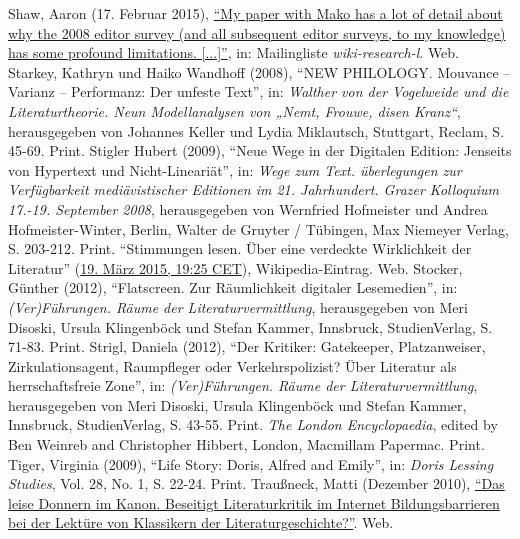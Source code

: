 \documentclass[fontsize=12pt]{scrartcl}
\begin{document}
{{{{\begin{thebibliography}
	Shaw, Aaron (17. Februar 2015), \href{https://lists.wikimedia.org/pipermail/wiki-research-l/2015-February/004172.html}{"`My paper with Mako has a lot of detail about why the 2008 editor survey (and all subsequent editor surveys, to my know\-ledge) has some profound limitations. [...]"'}, in: Mailing\-liste \textit{wiki-research-l}. Web.
	Starkey, Kathryn und Haiko Wandhoff (2008), "`NEW PHILOLOGY. Mouvance -- Va\-ri\-anz -- Performanz: Der unfeste Text"', in: \textit{Walther von der Vogelweide und die Li\-te\-ra\-tur\-theorie. Neun Modellana\-lysen von „Nemt, Frouwe, disen Kranz“}, he\-rausgegeben von Johannes Keller und Lydia Miklautsch, Stuttgart, Reclam, S. 45-69. Print.
	Stigler Hubert (2009), "`Neue Wege in der Digitalen Edition: Jenseits von Hypertext und Nicht-Lineari\"at"', in: \textit{Wege zum Text. \"uberlegungen zur Verf\"ugbarkeit medi\"avistischer Editionen im 21. Jahrhundert. Grazer Kolloquium 17.-19. September 2008}, he\-rausgegeben von Wernfried Hofmeister und Andrea Hofmeister-Winter, Ber\-lin, Walter de Gruyter / T\"ubingen, Max Niemeyer Verlag, S. 203-212. Print.
	"`Stimmungen lesen. \"Uber eine verdeckte Wirklichkeit der Li\-te\-ra\-tur"' (\href{https://de.wikipedia.org/w/index.php?title=Stimmungen_lesen._\%C3\%9Cber_eine_verdeckte_Wirklichkeit_der_Literatur\&oldid=139943406}{19. M\"arz 2015, 19:25 CET}), Wi\-ki\-pe\-dia-Ein\-trag. Web.
	Stocker, G\"unther (2012), "`Flatscreen. Zur R\"aumlichkeit digitaler Lesemedien"', in: \textit{(Ver)\-F\"uh\-rungen. R\"aume der Li\-te\-ra\-tur\-ver\-mitt\-lung}, he\-rausgegeben von Meri Disoski, Ursula Klingenb\"ock und Stefan Kammer, Innsbruck, StudienVerlag, S. 71-83. Print.
	Strigl, Daniela (2012), "`Der Kritiker: Gatekeeper, Platzanweiser, Zirkulationsagent, Raum\-pfleger oder Verkehrspolizist? \"Uber Li\-te\-ra\-tur als herrschaftsfreie Zone"', in: \textit{(Ver)F\"uh\-rungen. R\"aume der Li\-te\-ra\-tur\-ver\-mitt\-lung}, he\-rausgegeben von Meri Disoski, Ursula Klingenb\"ock und Stefan Kammer, Innsbruck, StudienVerlag, S. 43-55. Print.
	\textit{The London Encyclopaedia}, edited by Ben Weinreb and Christopher Hibbert, London, Macmillam Papermac. Print.
	Tiger, Virginia (2009), "`Life Story: Doris, Alfred and Emily"', in: \textit{Doris Lessing Studies}, Vol. 28, No. 1, S. 22-24. Print.
	Trau{\ss}neck, Matti (Dezember 2010), \href{http://www.literaturkritik.de/public/rezension.php?rez_id=15119}{"`Das leise Donnern im Kanon. Beseitigt Li\-te\-ra\-tur\-kritik im Internet Bildungsbarrieren bei der Lekt\"ure von \flq Klassikern\frq \,\,der Li\-te\-ra\-tur\-ge\-schich\-te?"'}. Web.

\end{thebibliography}}}}}
\end{document}
